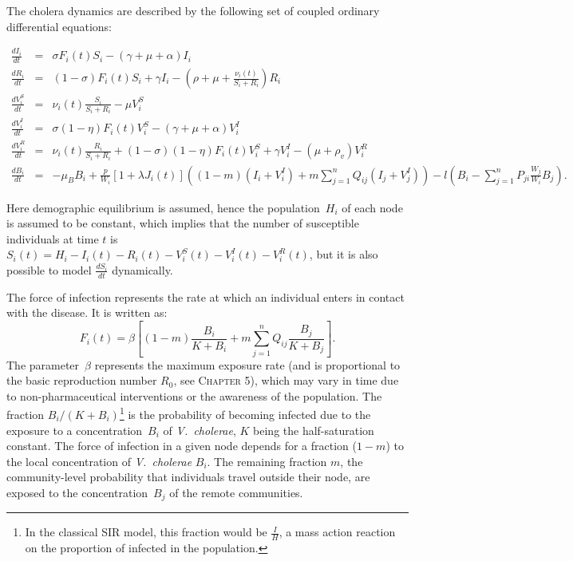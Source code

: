 The cholera dynamics are described by the following set of coupled ordinary differential equations:
\begin{fullwidth}

\begingroup
\allowdisplaybreaks
\begin{eqnarray}
\frac{dI_i}{dt} &=& \sigma F_i(t) S_i - (\gamma + \mu + \alpha) I_i \label{eq:I2}\\
\frac{dR_i}{dt} &=& (1-\sigma) F_i(t) S_i + \gamma I_i - (\rho + \mu+\frac{\nu_i(t)}{S_i+R_i}) R_i \label{eq:R2}\\
\frac{dV^S_i}{dt} &=& \nu_i(t) \frac{S_i}{S_i+R_i}-\mu V^S_i \label{eq:VS2}\\
\frac{dV^I_i}{dt} &=& \sigma (1-\eta) F_i(t) V^S_i - (\gamma + \mu + \alpha) V^I_i \label{eq:VI2}\\
\frac{dV^R_i}{dt} &=& \nu_i(t) \frac{R_i}{S_i+R_i} + (1-\sigma) (1-\eta) F_i(t) V^S_i + \gamma V^I_i - (\mu+\rho_v) V^R_i \label{eq:VR2}\\
\frac{dB_i}{dt} &=& - \mu_B B_i +\frac{p}{W_i}\left[1 + \lambda J_i(t) \right] \left((1-m)(I_i +V_i^I)+m \sum_{j=1}^n Q_{ij} (I_j +V_j^I)\right)-  l \left( B_i - \sum_{j=1}^n P_{ji} \frac{W_j}{W_i} B_j \right).
\end{eqnarray}
\endgroup
\end{fullwidth}
Here demographic equilibrium is assumed, hence the population~$H_i$ of each node is assumed to be constant, which implies that the number of susceptible individuals at time $t$ is $S_i(t) = H_i - I_i(t) - R_i(t) - V_i^S(t) - V^I_i(t) - V_i^R(t)$, but it is also possible to model $\frac{dS_i}{dt}$ dynamically.   

The force of infection represents the rate at which an individual enters in contact with the disease. It is written as:
\begin{equation}
F_i(t) = \beta \left[ (1 - m) \frac{B_i}{K + B_i} + m \sum_{j=1}^n Q_{ij} \frac{B_j}{K + B_j} \right].
\label{force}
\end{equation}
The parameter~$\beta$ represents the maximum exposure rate (and is proportional to the basic reproduction number $R_0$, see \textsc{Chapter 5}), which may vary in time due to non-pharmaceutical interventions or the awareness of the population\cite{Bertuzzo:ProbabilityExtinctionHaiti:2016}. The fraction $B_{i}/(K+B_{i})$\footnote{In the classical SIR model, this fraction would be $\frac{I}{H}$, a mass action reaction on the proportion of infected in the population.} is the probability of becoming infected due to the exposure to a concentration~$B_i$ of \textit{V.~cholerae}, $K$ being the half-saturation constant\cite{Codeco:EndemicEpidemicDynamics:2001}. The force of infection in a given node depends for a fraction ($1-m$) to the local concentration of \textit{V.~cholerae} $B_i$. The remaining fraction $m$, the community-level probability that individuals travel outside their node, are exposed to the concentration~$B_j$ of the remote communities. 

